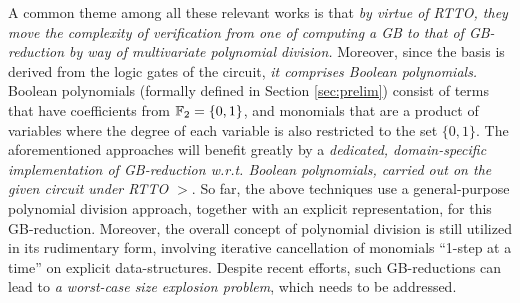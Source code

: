 A common theme among all these relevant works is that {\it by virtue
of RTTO, they move the complexity of verification from one of
computing a GB to that of GB-reduction by way of multivariate
polynomial division.} Moreover, since the \Grobner basis is derived
from the logic gates of the circuit, {\it it comprises Boolean
polynomials.} Boolean polynomials (formally defined in
Section \ref{sec:prelim})  consist of terms that have coefficients
from ${\mathbb{F}}_{2} = \{0,1\}$, and monomials that are a product of
variables where the degree of each variable is also restricted to
the set $\{0,1\}$. 
The aforementioned approaches will
benefit greatly by a {\it dedicated,  
domain-specific implementation of GB-reduction w.r.t. Boolean polynomials,
carried out on the given circuit under RTTO $>$}. So far, the above
techniques  
\cite{wienand:cav08,pruss:tcad,lv:tcad2013,rolf:date16,ciesielski:dac2015,cunxi:aspdac17}
use a general-purpose polynomial division approach, together with an
explicit representation, for this GB-reduction. 
Moreover, the overall concept of polynomial division is
still utilized in its rudimentary form, involving iterative
cancellation of monomials ``1-step at a time'' on explicit
data-structures. Despite recent efforts, such GB-reductions can lead
to {\it a worst-case size explosion problem}, which needs to be
addressed. 


